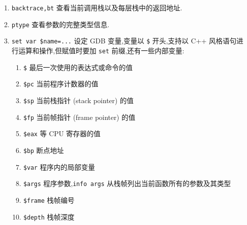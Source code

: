\begin{enumerate}
        \item \texttt{backtrace,bt} 查看当前调用栈以及每层栈中的返回地址.
        \item \texttt{ptype} 查看参数的完整类型信息.
        \item \texttt{set var \$name=...} 设定 GDB 变量,变量以 \texttt{\$} 开头,支持以 C++ 风格语句进行运算和操作,但赋值时要加 \texttt{set} 前缀,还有一些内部变量:
            \begin{enumerate}
                \item \texttt{\$} 最后一次使用的表达式或命令的值
                \item \texttt{\$pc} 当前程序计数器的值
                \item \texttt{\$sp} 当前栈指针 (stack pointer) 的值
                \item \texttt{\$fp} 当前帧指针 (frame pointer) 的值
                \item \texttt{\$eax} 等 CPU 寄存器的值
                \item \texttt{\$bp} 断点地址
                \item \texttt{\$var} 程序内的局部变量
                \item \texttt{\$args} 程序参数,\texttt{info args} 从栈帧列出当前函数所有的参数及其类型
                \item \texttt{\$frame} 栈帧编号
                \item \texttt{\$depth} 栈帧深度
            \end{enumerate}
    \end{enumerate}

